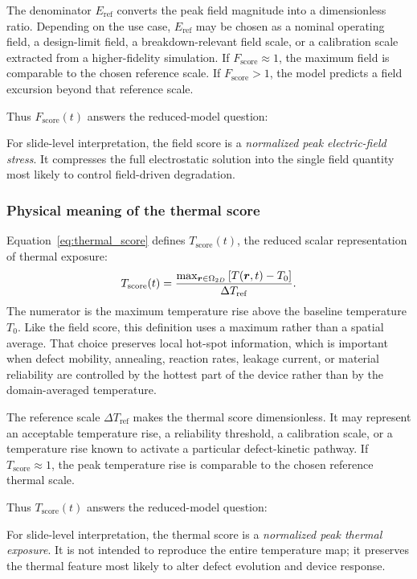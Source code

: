 \documentclass[11pt]{article}
\begin{document}
The denominator \(E_{\mathrm{ref}}\) converts the peak field magnitude into a dimensionless ratio. Depending on the use case, \(E_{\mathrm{ref}}\) may be chosen as a nominal operating field, a design-limit field, a breakdown-relevant field scale, or a calibration scale extracted from a higher-fidelity simulation. If \(F_{\mathrm{score}}\approx 1\), the maximum field is comparable to the chosen reference scale. If \(F_{\mathrm{score}}>1\), the model predicts a field excursion beyond that reference scale.

Thus \(F_{\mathrm{score}}(t)\) answers the reduced-model question:
\begin{center}
\end{center}
For slide-level interpretation, the field score is a \emph{normalized peak electric-field stress}. It compresses the full electrostatic solution into the single field quantity most likely to control field-driven degradation.

\subsubsection{Physical meaning of the thermal score}
Equation~\eqref{eq:thermal_score} defines \(T_{\mathrm{score}}(t)\), the reduced scalar representation of thermal exposure:
\[
    T_{\mathrm{score}}(t)
    =
    \frac{\max_{\bm{r}\in\Omega_{2D}} \left[T(\bm{r},t)-T_0\right]}
    {\Delta T_{\mathrm{ref}}}.
\]
The numerator is the maximum temperature rise above the baseline temperature \(T_0\). Like the field score, this definition uses a maximum rather than a spatial average. That choice preserves local hot-spot information, which is important when defect mobility, annealing, reaction rates, leakage current, or material reliability are controlled by the hottest part of the device rather than by the domain-averaged temperature.

The reference scale \(\Delta T_{\mathrm{ref}}\) makes the thermal score dimensionless. It may represent an acceptable temperature rise, a reliability threshold, a calibration scale, or a temperature rise known to activate a particular defect-kinetic pathway. If \(T_{\mathrm{score}}\approx 1\), the peak temperature rise is comparable to the chosen reference thermal scale.

Thus \(T_{\mathrm{score}}(t)\) answers the reduced-model question:
\begin{center}
\end{center}
For slide-level interpretation, the thermal score is a \emph{normalized peak thermal exposure}. It is not intended to reproduce the entire temperature map; it preserves the thermal feature most likely to alter defect evolution and device response.
\end{document}
